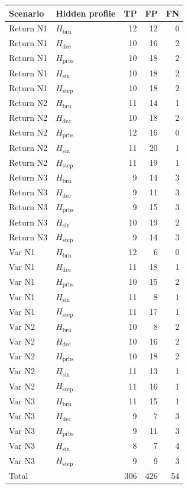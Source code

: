 \begin{tabular}{llrrr}
\toprule
Scenario & Hidden profile & TP & FP & FN \\
\midrule
Return N1 & $H_{\mathrm{brn}}$ & 12 & 12 & 0 \\
Return N1 & $H_{\mathrm{dec}}$ & 10 & 16 & 2 \\
Return N1 & $H_{\mathrm{prbs}}$ & 10 & 18 & 2 \\
Return N1 & $H_{\mathrm{sin}}$ & 10 & 18 & 2 \\
Return N1 & $H_{\mathrm{step}}$ & 10 & 18 & 2 \\
Return N2 & $H_{\mathrm{brn}}$ & 11 & 14 & 1 \\
Return N2 & $H_{\mathrm{dec}}$ & 10 & 18 & 2 \\
Return N2 & $H_{\mathrm{prbs}}$ & 12 & 16 & 0 \\
Return N2 & $H_{\mathrm{sin}}$ & 11 & 20 & 1 \\
Return N2 & $H_{\mathrm{step}}$ & 11 & 19 & 1 \\
Return N3 & $H_{\mathrm{brn}}$ & 9 & 14 & 3 \\
Return N3 & $H_{\mathrm{dec}}$ & 9 & 11 & 3 \\
Return N3 & $H_{\mathrm{prbs}}$ & 9 & 15 & 3 \\
Return N3 & $H_{\mathrm{sin}}$ & 10 & 19 & 2 \\
Return N3 & $H_{\mathrm{step}}$ & 9 & 14 & 3 \\
Var N1 & $H_{\mathrm{brn}}$ & 12 & 6 & 0 \\
Var N1 & $H_{\mathrm{dec}}$ & 11 & 18 & 1 \\
Var N1 & $H_{\mathrm{prbs}}$ & 10 & 15 & 2 \\
Var N1 & $H_{\mathrm{sin}}$ & 11 & 8 & 1 \\
Var N1 & $H_{\mathrm{step}}$ & 11 & 17 & 1 \\
Var N2 & $H_{\mathrm{brn}}$ & 10 & 8 & 2 \\
Var N2 & $H_{\mathrm{dec}}$ & 10 & 16 & 2 \\
Var N2 & $H_{\mathrm{prbs}}$ & 10 & 18 & 2 \\
Var N2 & $H_{\mathrm{sin}}$ & 11 & 13 & 1 \\
Var N2 & $H_{\mathrm{step}}$ & 11 & 16 & 1 \\
Var N3 & $H_{\mathrm{brn}}$ & 11 & 15 & 1 \\
Var N3 & $H_{\mathrm{dec}}$ & 9 & 7 & 3 \\
Var N3 & $H_{\mathrm{prbs}}$ & 9 & 11 & 3 \\
Var N3 & $H_{\mathrm{sin}}$ & 8 & 7 & 4 \\
Var N3 & $H_{\mathrm{step}}$ & 9 & 9 & 3 \\
\midrule
Total &  & 306 & 426 & 54 \\
\bottomrule
\end{tabular}

